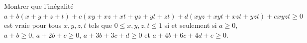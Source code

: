 Montrer que l'inégalité $a + b(x + y + z + t) + c(xy + xz + xt + yz + yt + zt) + d(xyz + xyt + xzt + yzt) + exyzt \geq 0$ est vraie pour tous $x, y, z, t$ tels que $0 \leq x, y, z, t \leq 1$ si et seulement si $a \geq 0$, $a + b \geq 0$, $a + 2b + c \geq 0$, $a + 3b + 3c + d \geq 0$ et $a + 4b + 6c + 4d + e \geq 0$.
